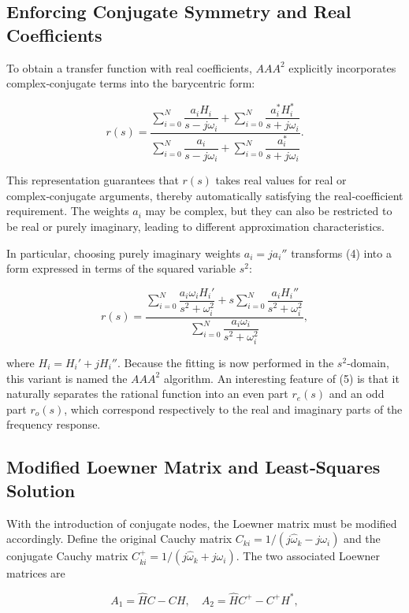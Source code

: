 \documentclass{article}
\begin{document}
\subsection{Enforcing Conjugate Symmetry and Real Coefficients}

To obtain a transfer function with real coefficients, $AAA^{2}$ explicitly incorporates complex‑conjugate terms into the barycentric form:

\[
r(s) = \frac{\sum_{i=0}^{N} \dfrac{a_i H_i}{s - j\omega_i} + \sum_{i=0}^{N} \dfrac{a_i^* H_i^*}{s + j\omega_i}}{\sum_{i=0}^{N} \dfrac{a_i}{s - j\omega_i} + \sum_{i=0}^{N} \dfrac{a_i^*}{s + j\omega_i}}. \tag{4}
\]

This representation guarantees that \(r(s)\) takes real values for real or complex‑conjugate arguments, thereby automatically satisfying the real‑coefficient requirement. The weights \(a_i\) may be complex, but they can also be restricted to be real or purely imaginary, leading to different approximation characteristics.

In particular, choosing purely imaginary weights \(a_i = j a_i''\) transforms (4) into a form expressed in terms of the squared variable \(s^2\):

\[
r(s) = \frac{\sum_{i=0}^{N} \dfrac{a_i \omega_i H_i'}{s^2 + \omega_i^2} + s \sum_{i=0}^{N} \dfrac{a_i H_i''}{s^2 + \omega_i^2}}{\sum_{i=0}^{N} \dfrac{a_i \omega_i}{s^2 + \omega_i^2}}, \tag{5}
\]

where \(H_i = H_i' + jH_i''\). Because the fitting is now performed in the \(s^2\)-domain, this variant is named the $AAA^{2}$ algorithm. An interesting feature of (5) is that it naturally separates the rational function into an even part \(r_e(s)\) and an odd part \(r_o(s)\), which correspond respectively to the real and imaginary parts of the frequency response.

\subsection{Modified Loewner Matrix and Least‑Squares Solution}

With the introduction of conjugate nodes, the Loewner matrix must be modified accordingly. Define the original Cauchy matrix \(C_{ki} = 1/(j\hat{\omega}_k - j\omega_i)\) and the conjugate Cauchy matrix \(C_{ki}^+ = 1/(j\hat{\omega}_k + j\omega_i)\). The two associated Loewner matrices are

\[
A_1 = \hat{H}C - CH,\quad A_2 = \hat{H}C^+ - C^+ H^*, \tag{6}
\]
\end{document}
